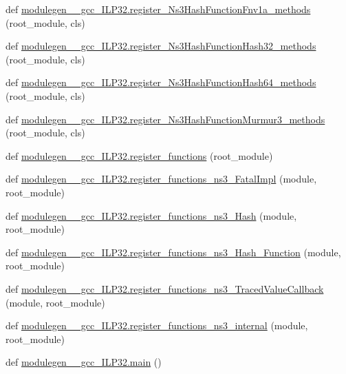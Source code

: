 \begin{DoxyCompactItemize}
\item 
def \hyperlink{namespacemodulegen____gcc__ILP32_a8a8387218e2c3d882054e6b56a6a4b07}{modulegen\+\_\+\+\_\+gcc\+\_\+\+I\+L\+P32.\+register\+\_\+\+Ns3\+Hash\+Function\+Fnv1a\+\_\+methods} (root\+\_\+module, cls)
\item 
def \hyperlink{namespacemodulegen____gcc__ILP32_afac315fff05eebcf56ca0655484fb790}{modulegen\+\_\+\+\_\+gcc\+\_\+\+I\+L\+P32.\+register\+\_\+\+Ns3\+Hash\+Function\+Hash32\+\_\+methods} (root\+\_\+module, cls)
\item 
def \hyperlink{namespacemodulegen____gcc__ILP32_a5bb0479ce8e16c48c18c0b8db959d57b}{modulegen\+\_\+\+\_\+gcc\+\_\+\+I\+L\+P32.\+register\+\_\+\+Ns3\+Hash\+Function\+Hash64\+\_\+methods} (root\+\_\+module, cls)
\item 
def \hyperlink{namespacemodulegen____gcc__ILP32_aac40fb7a316e95e431da9cf4c6a3e3a0}{modulegen\+\_\+\+\_\+gcc\+\_\+\+I\+L\+P32.\+register\+\_\+\+Ns3\+Hash\+Function\+Murmur3\+\_\+methods} (root\+\_\+module, cls)
\item 
def \hyperlink{namespacemodulegen____gcc__ILP32_a78223e19764a9a9c4a101c5cff0fe501}{modulegen\+\_\+\+\_\+gcc\+\_\+\+I\+L\+P32.\+register\+\_\+functions} (root\+\_\+module)
\item 
def \hyperlink{namespacemodulegen____gcc__ILP32_afe103c28425c708bef38a8cb16badb60}{modulegen\+\_\+\+\_\+gcc\+\_\+\+I\+L\+P32.\+register\+\_\+functions\+\_\+ns3\+\_\+\+Fatal\+Impl} (module, root\+\_\+module)
\item 
def \hyperlink{namespacemodulegen____gcc__ILP32_a15bbba0d88ee02afb1f5d32d8a94ea14}{modulegen\+\_\+\+\_\+gcc\+\_\+\+I\+L\+P32.\+register\+\_\+functions\+\_\+ns3\+\_\+\+Hash} (module, root\+\_\+module)
\item 
def \hyperlink{namespacemodulegen____gcc__ILP32_a0f9329a49ae57d68c45aee88be7a193f}{modulegen\+\_\+\+\_\+gcc\+\_\+\+I\+L\+P32.\+register\+\_\+functions\+\_\+ns3\+\_\+\+Hash\+\_\+\+Function} (module, root\+\_\+module)
\item 
def \hyperlink{namespacemodulegen____gcc__ILP32_af7ef11aed69cbf420d75dc2f54dcef3d}{modulegen\+\_\+\+\_\+gcc\+\_\+\+I\+L\+P32.\+register\+\_\+functions\+\_\+ns3\+\_\+\+Traced\+Value\+Callback} (module, root\+\_\+module)
\item 
def \hyperlink{namespacemodulegen____gcc__ILP32_a38f99ffef038c5418d70aef09b99e58d}{modulegen\+\_\+\+\_\+gcc\+\_\+\+I\+L\+P32.\+register\+\_\+functions\+\_\+ns3\+\_\+internal} (module, root\+\_\+module)
\item 
def \hyperlink{namespacemodulegen____gcc__ILP32_aadf64690f6ba129a8d42469ea6da5a2d}{modulegen\+\_\+\+\_\+gcc\+\_\+\+I\+L\+P32.\+main} ()
\end{DoxyCompactItemize}
